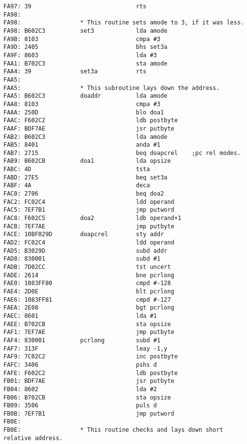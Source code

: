 {\begin{verbatim}
FA97: 39                              rts             
FA98:                                                 
FA98:                 * This routine sets amode to 3, if it was less.
FA98: B602C3          set3            lda amode
FA9B: 8103                            cmpa #3
FA9D: 2405                            bhs set3a
FA9F: 8603                            lda #3
FAA1: B702C3                          sta amode
FAA4: 39              set3a           rts
FAA5:                 
FAA5:                 * This subroutine lays down the address.
FAA5: B602C3          doaddr          lda amode
FAA8: 8103                            cmpa #3
FAAA: 250D                            blo doa1
FAAC: F602C2                          ldb postbyte
FAAF: BDF7AE                          jsr putbyte
FAB2: B602C3                          lda amode 
FAB5: 8401                            anda #1
FAB7: 2715                            beq doapcrel    ;pc rel modes.
FAB9: B602CB          doa1            lda opsize
FABC: 4D                              tsta
FABD: 27E5                            beq set3a
FABF: 4A                              deca
FAC0: 2706                            beq doa2
FAC2: FC02C4                          ldd operand
FAC5: 7EF7B1                          jmp putword
FAC8: F602C5          doa2            ldb operand+1
FACB: 7EF7AE                          jmp putbyte             
FACE: 10BF029D        doapcrel        sty addr
FAD2: FC02C4                          ldd operand
FAD5: B3029D                          subd addr
FAD8: 830001                          subd #1
FADB: 7D02CC                          tst uncert
FADE: 2614                            bne pcrlong
FAE0: 1083FF80                        cmpd #-128
FAE4: 2D0E                            blt pcrlong
FAE6: 1083FF81                        cmpd #-127
FAEA: 2E08                            bgt pcrlong
FAEC: 8601                            lda #1
FAEE: B702CB                          sta opsize
FAF1: 7EF7AE                          jmp putbyte
FAF4: 830001          pcrlong         subd #1
FAF7: 313F                            leay -1,y
FAF9: 7C02C2                          inc postbyte
FAFC: 3406                            pshs d
FAFE: F602C2                          ldb postbyte
FB01: BDF7AE                          jsr putbyte
FB04: 8602                            lda #2
FB06: B702CB                          sta opsize
FB09: 3506                            puls d
FB0B: 7EF7B1                          jmp putword
FB0E:                 
FB0E:                 * This routine checks and lays down short relative address.

\end{verbatim}}
